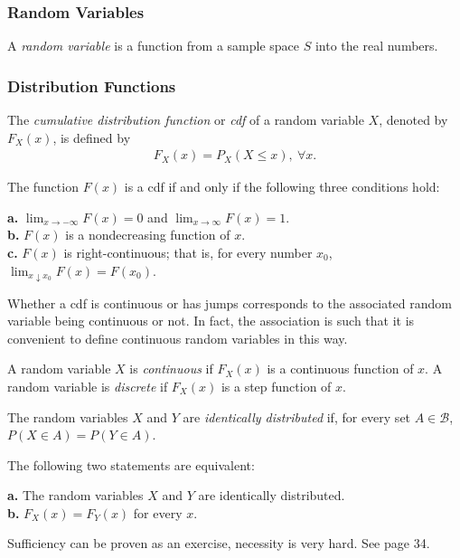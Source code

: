 \subsubsection{Random Variables}
\begin{defn}
    A \textit{random variable} is a function from a sample space $S$ into the real numbers.
\end{defn}

\subsubsection{Distribution Functions}
\begin{defn}
    The \textit{cumulative distribution function} or \textit{cdf} of a random variable $X$, denoted by $F_X(x)$, is defined by
    \begin{align*}
        F_X(x) = P_X(X \leq x),\ \forall x.
    \end{align*}
\end{defn}
\begin{thm}
    The function $F(x)$ is a cdf if and only if the following three conditions hold:

    \textbf{a.} $\lim_{x \rightarrow -\infty} F(x) = 0$ and $\lim_{x \rightarrow \infty} F(x) = 1$. \\
    \textbf{b.} $F(x)$ is a nondecreasing function of $x$. \\
    \textbf{c.} $F(x)$ is right-continuous; that is, for every number $x_0$, $\lim_{x \downarrow x_0} F(x) = F(x_0)$.
\end{thm}
Whether a cdf is continuous or has jumps corresponds to the associated random variable being continuous or not. In fact, the association is such that it is convenient to define continuous random variables in this way.
\begin{defn}
    A random variable $X$ is \textit{continuous} if $F_X(x)$ is a continuous function of $x$. A random variable is \textit{discrete} if $F_X(x)$ is a step function of $x$.
\end{defn}
\begin{defn}
    The random variables $X$ and $Y$ are \textit{identically distributed} if, for every set $A \in \mathcal{B}$, $P(X \in A) = P(Y \in A)$.
\end{defn}
\begin{thm}
    The following two statements are equivalent:

    \textbf{a.} The random variables $X$ and $Y$ are identically distributed. \\
    \textbf{b.} $F_X(x) = F_Y(x)$ for every $x$.
\end{thm}
Sufficiency can be proven as an exercise, necessity is very hard. See page 34.
